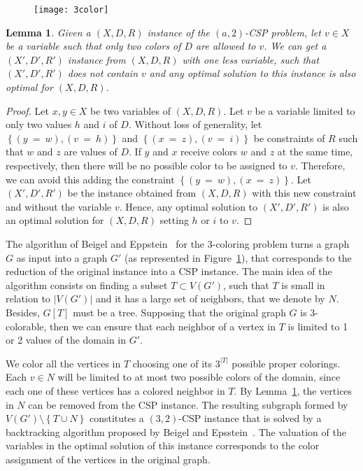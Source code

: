 \documentclass[fleqn,10pt]{SelfArx} %
\newtheorem{lema}{Lemma}
\newcommand{\chaves}[1] {\ensuremath{{\left \{ {#1} \right \}}}}
\begin{document}
	\begin{figure}[h]
		\centering
		\texttt{[image: 3color]}
		\label{fig:1}
	\end{figure}
	
	\begin{lema}\label{lema:1} Given a $(X,D,R)$ instance of
		the $(a,2)$-CSP problem, let $v \in X$ be a variable such that only two
		colors of $D$ are allowed to $v$. We can get a $(X',D',R')$ instance
		from $(X,D,R)$ with one less variable, such that $(X',D',R')$ does not
		contain $v$ and any optimal solution to this instance is also optimal
		for $(X,D,R)$.
		
	\end{lema}
	\begin{proof} Let $x,y \in X$ be two variables of $(X,D,R)$. Let $v$ be
		a variable limited to only two values $h$ and $i$ of $D$. Without loss
		of generality, let $\chaves{(y~=~w),(v~=~h)}$ and $\chaves{(x~=~z),(v~=~i)}$ be
		constraints of $R$ such that $w$ and $z$ are values of $D$. If $y$ and
		$x$ receive colors $w$ and $z$ at the same time, respectively, then
		there will be no possible color to be assigned to $v$. Therefore, we
		can avoid this adding the constraint $\chaves{(y~=~w),(x~=~z)}$. Let
		$(X',D',R')$ be the instance obtained from $(X,D,R)$ with this new
		constraint and without the variable $v$. Hence, any optimal solution
		to $(X',D',R')$ is also an optimal solution for $(X,D,R)$ setting $h$
		or $i$ to $v$.
	\end{proof}
	
	The algorithm of Beigel and Eppstein~\cite{BeigelEppstein05} for the 3-coloring problem turns a graph $G$ as input into a graph $G'$ (as represented in Figure~\ref{fig:1}), that corresponds to the reduction of the original instance into a CSP instance. The main idea of the algorithm consists on finding a subset $T \subset V(G')$, such that $T$ is small in relation to $|V(G')|$ and it has a large set of neighbors, that we denote by $N$. Besides, $G[T]$ must be a tree. Supposing that the original graph $G$ is
	3-colorable, then we can ensure that each neighbor of a vertex in $T$
	is limited to 1 or 2 values of the domain in $G'$. \par 
	We color all the vertices in $T$ choosing one of its
	$3^{|T|}$ possible proper colorings. Each $v \in N$ will be limited to
	at most two possible colors of the domain, since each one of these
	vertices has a colored neighbor in $T$. By Lemma~\ref{lema:1}, the
	vertices in $N$ can be removed from the CSP instance. The resulting
	subgraph formed by $V(G') \setminus \chaves{T \cup N}$ constitutes a $(3,2)$-CSP
	instance that is solved by a backtracking algorithm proposed by Beigel and Epsstein~\cite{BeigelEppstein05}. The valuation of the variables in the optimal solution of this instance corresponds to the color assignment of the vertices in the original graph.
	
\end{document}
